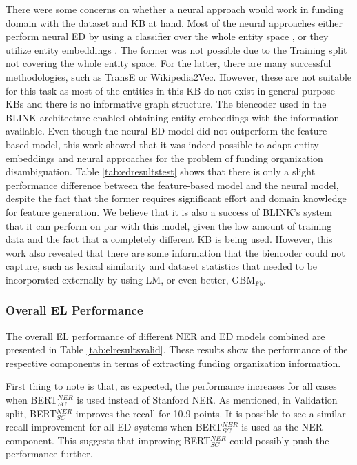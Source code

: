 \documentclass{report}
\theoremstyle{definition}
\theoremstyle{remark}
\begin{document}
There were some concerns on whether a neural approach would work in funding domain with the dataset and KB at hand. Most of the neural approaches either perform neural ED by using a classifier over the whole entity space \cite{bertEL}, or they utilize entity embeddings \cite{scalablezeroshot,dca,googleintern}. The former was not possible due to the Training split not covering the whole entity space. For the latter, there are many successful methodologies, such as TransE or Wikipedia2Vec. However, these are not suitable for this task as most of the entities in this KB do not exist in general-purpose KBs and there is no informative graph structure. The biencoder used in the BLINK architecture enabled obtaining entity embeddings with the information available. Even though the neural ED model did not outperform the feature-based model, this work showed that it was indeed possible to adapt entity embeddings and neural approaches for the problem of funding organization disambiguation. Table \ref{tab:edresultstest} shows that there is only a slight performance difference between the feature-based model and the neural model, despite the fact that the former requires significant effort and domain knowledge for feature generation. We believe that it is also a success of BLINK's system that it can perform on par with this model, given the low amount of training data and the fact that a completely different KB is being used. However, this work also revealed that there are some information that the biencoder could not capture, such as lexical similarity and dataset statistics that needed to be incorporated externally by using LM, or even better, GBM$_{F5}$.

\subsubsection{Overall EL Performance}
The overall EL performance of different NER and ED models combined are presented in Table \ref{tab:elresultsvalid}. These results show the performance of the respective components in terms of extracting funding organization information.

First thing to note is that, as expected, the performance increases for all cases when BERT$_{SC}^{NER}$ is used instead of Stanford NER. As mentioned, in Validation split, BERT$_{SC}^{NER}$ improves the recall for 10.9 points. It is possible to see a similar recall improvement for all ED systems when BERT$_{SC}^{NER}$ is used as the NER component. This suggests that improving BERT$_{SC}^{NER}$ could possibly push the performance further. 
\end{document}

